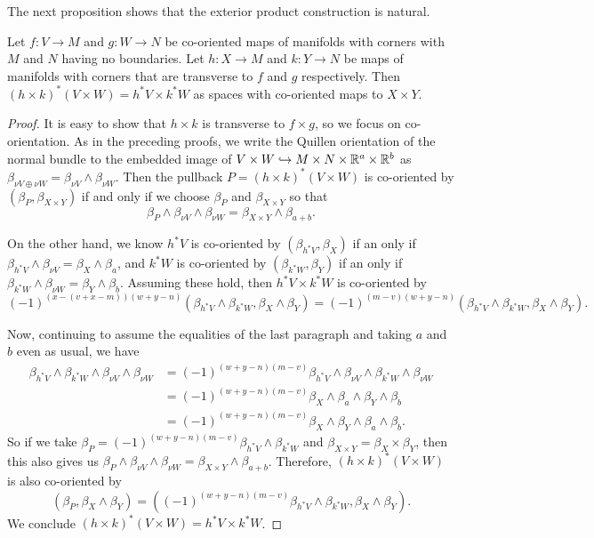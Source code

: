 The next proposition shows that the exterior product construction is natural.

\begin{proposition}\label{P: natural exterior}
	Let $f \colon V \to M$ and $g \colon W \to N$ be co-oriented maps of manifolds with corners with $M$ and $N$ having no boundaries.
	Let $h \colon X \to M$ and $k \colon Y \to N$ be maps of manifolds with corners that are transverse to $f$ and $g$ respectively.
	Then $(h \times k)^*(V \times W) = h^*V \times k^*W$ as spaces with co-oriented maps to $X \times Y$.
\end{proposition}

\begin{proof}
	It is easy to show that $h \times k$ is transverse to $f \times g$, so we focus on co-orientation.
	As in the preceding proofs, we write the Quillen orientation of the normal bundle to the embedded image of $V \times W \hookrightarrow M \times N \times \mathbb{R}^a \times \mathbb{R}^b$ as $\beta_{\nu V \oplus \nu W} = \beta_{\nu V} \wedge \beta_{\nu W}$.
	Then the pullback $P = (h \times k)^*(V \times W)$ is co-oriented by $(\beta_P,\beta_{X \times Y})$ if and only if we choose $\beta_P$ and $\beta_{X \times Y}$ so that
	$$\beta_{P} \wedge \beta_{\nu V} \wedge \beta_{\nu W} = \beta_{X \times Y} \wedge \beta_{a+b}.$$

	On the other hand, we know $h^*V$ is co-oriented by $(\beta_{h^*V},\beta_X)$ if an only if $\beta_{h^*V} \wedge \beta_{\nu V} = \beta_X \wedge \beta_a$, and $k^*W$ is co-oriented by $(\beta_{k^*W},\beta_Y)$ if an only if $\beta_{k^*W} \wedge \beta_{\nu W} = \beta_Y \wedge \beta_b$.
	Assuming these hold, then $h^*V \times k^*W$ is co-oriented by $$(-1)^{(x-(v+x-m))(w+y-n)}(\beta_{h^*V} \wedge \beta_{k^*W},\beta_X \wedge \beta_Y) = (-1)^{(m-v)(w+y-n)}(\beta_{h^*V} \wedge \beta_{k^*W},\beta_X \wedge \beta_Y).$$

	Now, continuing to assume the equalities of the last paragraph and taking $a$ and $b$ even as usual, we have
	\begin{align*}
		\beta_{h^*V} \wedge \beta_{k^*W} \wedge \beta_{\nu V} \wedge \beta_{\nu W}
		& = (-1)^{(w+y-n)(m-v)}\beta_{h^*V} \wedge \beta_{\nu V} \wedge \beta_{k^*W} \wedge \beta_{\nu W}\\
		& = (-1)^{(w+y-n)(m-v)}\beta_X \wedge \beta_a \wedge \beta_Y \wedge \beta_b \\
		& = (-1)^{(w+y-n)(m-v)}\beta_X \wedge \beta_Y \wedge \beta_a \wedge \beta_b.
	\end{align*}
	So if we take $\beta_P = (-1)^{(w+y-n)(m-v)}\beta_{h^*V} \wedge \beta_{k^*W}$ and $\beta_{X \times Y} = \beta_X \times \beta_Y$, then this also gives us $\beta_{P} \wedge \beta_{\nu V} \wedge \beta_{\nu W} = \beta_{X \times Y} \wedge \beta_{a+b}$.
	Therefore,
	$(h \times k)^*(V \times W)$ is also co-oriented by
	$$(\beta_P,\beta_X \wedge \beta_Y) = ((-1)^{(w+y-n)(m-v)}\beta_{h^*V} \wedge \beta_{k^*W},\beta_X \wedge \beta_Y).$$ We conclude $(h \times k)^*(V \times W) = h^*V \times k^*W$.
\end{proof}

